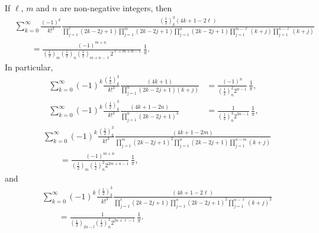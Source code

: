 \documentclass[12pt,reqno]{article}
\begin{document}
\begin{corollary}
If $\ell$, $m$ and $n$ are non-negative integers, then
\begin{align*}
&\sum_{k = 0}^\infty  {\frac{{( - 1)^k }}{{k!^3 }}\frac{{\left( {\frac{1}{2}} \right)_k^3 \left( {4k + 1 - 2\ell} \right)}}{{\prod_{j = 1}^\ell {\left( {2k - 2j + 1} \right)} \prod_{j = 1}^m {\left( {2k - 2j + 1} \right)} \prod_{j = 1}^n {\left( {2k - 2j + 1} \right)} \prod_{j = 1}^{m - \ell} {\left( {k + j} \right)} \prod_{j = 1}^{n - \ell} {\left( {k + j} \right)} }}}\\
&\qquad  = \frac{{( - 1)^{m + n} }}{{\left( {\frac{1}{2}} \right)_m \left( {\frac{1}{2}} \right)_n \left( {\frac{1}{2}} \right)_{m + n - \ell} 2^{\ell + m + n - 1} }}\,\frac{1}{\pi }.
\end{align*}
In particular,
\begin{align}
\sum_{k = 0}^\infty  {( - 1)^k \frac{{\left( {\frac{1}{2}} \right)_k^3 }}{{k!^3 }}\frac{{\left( {4k + 1} \right)}}{{\prod_{j = 1}^n {\left( {2k - 2j + 1} \right)\left( {k + j} \right)} }}}  &= \frac{{( - 1)^n }}{{\left( {\frac{1}{2}} \right)_n^2 2^{n - 1} }}\,\frac{1}{\pi },\\
\sum_{k = 0}^\infty  {( - 1)^k \frac{{\left( {\frac{1}{2}} \right)_k^3 }}{{k!^3 }}\frac{{\left( {4k + 1 - 2n} \right)}}{{\prod_{j = 1}^n {\left( {2k - 2j + 1} \right)^3 } }}}  &= \frac{1}{{\left( {\frac{1}{2}} \right)_n^3 2^{3n - 1} }}\,\frac{1}{\pi },
\end{align}
\begin{align}
&\sum_{k = 0}^\infty  {( - 1)^k \frac{{\left( {\frac{1}{2}} \right)_k^3 }}{{k!^3 }}\frac{{\left( {4k + 1 - 2m} \right)}}{{\prod_{j = 1}^m {\left( {2k - 2j + 1} \right)^2 } \prod_{j = 1}^n {\left( {2k - 2j + 1} \right)} \prod_{j = 1}^{n - m} {\left( {k + j} \right)} }}}\nonumber\\
&\qquad  = \frac{{( - 1)^{m + n} }}{{\left( {\frac{1}{2}} \right)_m \left( {\frac{1}{2}} \right)_n^2 2^{2m + n - 1} }}\,\frac{1}{\pi },
\end{align}
and
\begin{align}
&\sum_{k = 0}^\infty  {( - 1)^k \frac{{\left( {\frac{1}{2}} \right)_k^3 }}{{k!^3 }}\frac{{\left( {4k + 1 - 2\ell} \right)}}{{\prod_{j = 1}^\ell {\left( {2k - 2j + 1} \right)} \prod_{j = 1}^n {\left( {2k - 2j + 1} \right)^2 } \prod_{j = 1}^{n - \ell} {\left( {k + j} \right)^2 } }}}\nonumber\\
&\qquad  = \frac{1}{{\left( {\frac{1}{2}} \right)_{2n - l} \left( {\frac{1}{2}} \right)_n^2 2^{2n + \ell - 1} }}\,\frac{1}{\pi }.
\end{align}
\end{corollary}
\end{document}
